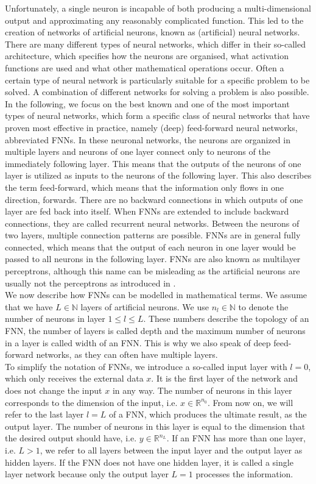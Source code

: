 Unfortunately, a single neuron is incapable of both producing a multi-dimensional output and approximating any reasonably complicated function. This led to the creation of networks of artificial neurons, known as (artificial) neural networks. There are many different types of neural networks, which differ in their so-called architecture, which specifies how the neurons are organised, what activation functions are used and what other mathematical operations occur. Often a certain type of neural network is particularly suitable for a specific problem to be solved. A combination of different networks for solving a problem is also possible. \\
In the following, we focus on the best known and one of the most important types of neural networks, which form a specific class of neural networks that have proven most effective in practice, namely (deep) feed-forward neural networks, abbreviated FNNs. In these neuronal networks, the neurons are organized in multiple layers and neurons of one layer connect only to neurons of the immediately following layer. This means that the outputs of the neurons of one layer is utilized as inputs to the neurons of the following layer. This also describes the term feed-forward, which means that the information only flows in one direction, forwards. There are no backward connections in which outputs of one layer are fed back into itself. When FNNs are extended to include backward connections, they are called recurrent neural networks. Between the neurons of two layers, multiple connection patterns are possible. FNNs are in general fully connected, which means that the output of each neuron in one layer would be passed to all neurons in the following layer. FNNs are also known as multilayer perceptrons, although this name can be misleading as the artificial neurons are usually not the perceptrons as introduced in \cite{Rosenblatt:1958}. \\
We now describe how FNNs can be modelled in mathematical terms. We assume that we have $L \in \mathbb{N}$ layers of artificial neurons. We use $n_l \in \mathbb{N}$ to denote the number of neurons in layer $1 \leq l \leq L$. These numbers describe the topology of an FNN, the number of layers is called depth and the maximum number of neurons in a layer is called width of an FNN. This is why we also speak of deep feed-forward networks, as they can often have multiple layers. \\
To simplify the notation of FNNs, we introduce a so-called input layer with $l=0$, which only receives the external data $x$. It is the first layer of the network and does not change the input $x$ in any way. The number of neurons in this layer corresponds to the dimension of the input, i.e. $x \in \mathbb{R}^{n_{0}}$. From now on, we will refer to the last layer $l = L$ of a FNN, which produces the ultimate result, as the output layer. The number of neurons in this layer is equal to the dimension that the desired output should have, i.e. $y \in \mathbb{R}^{n_{L}}$. If an FNN has more than one layer, i.e. $L>1$, we refer to all layers between the input layer and the output layer as hidden layers. If the FNN does not have one hidden layer, it is called a single layer network because only the output layer $L=1$ processes the information. \\
